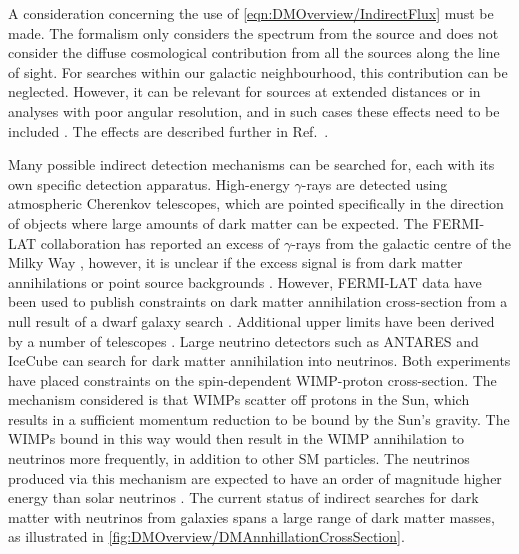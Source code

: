 A consideration concerning the use of \autoref{eqn:DMOverview/IndirectFlux} must be made. The formalism only considers the spectrum from the source and does not consider the diffuse
cosmological contribution from all the sources along the line of sight. For searches within our galactic neighbourhood, this contribution can be neglected. However, it can be relevant for sources at extended distances or in analyses with poor angular resolution, and in such cases these effects need to be included \cite{PerezdelosHeros:2020qyt}. The effects are described further in Ref.~\cite{Beacom:2006tt,Ullio:2002pj}.

Many possible indirect detection mechanisms can be searched for, each with its own specific detection apparatus.
High-energy $\gamma$-rays are detected using atmospheric Cherenkov telescopes, which are pointed specifically in the direction of objects where large amounts of dark matter can be expected. The FERMI-LAT collaboration has reported an excess of $\gamma$-rays from the galactic centre of the Milky Way \cite{Fermi-LAT:2015sau}, however, it is unclear if the excess signal is from dark matter annihilations or point source backgrounds \cite{Boyarsky_2011}. However, FERMI-LAT data have been used to publish constraints on dark matter annihilation cross-section from a null result of a dwarf galaxy search \cite{Fermi-LAT:2015ycq}. Additional upper limits have been derived by a number of telescopes \cite{Aleksic:2013xea,HESS:2014zqa,VERITAS:2017tif}. 
Large neutrino detectors such as ANTARES \cite{ANTARES:2016xuh} and IceCube \cite{IceCube:2009iyf} can search for dark matter annihilation into neutrinos. Both experiments have placed constraints on the spin-dependent WIMP-proton cross-section. The mechanism considered is that WIMPs scatter off protons in the Sun, which results in a sufficient momentum reduction to be bound by the Sun's gravity. The WIMPs bound in this way would then result in the WIMP annihilation to neutrinos more frequently, in addition to other SM particles. The neutrinos produced via this mechanism are expected to have an order of magnitude higher energy than solar neutrinos \cite{Hooper:2025ohk,Super-Kamiokande:2020sgt}. The current status of indirect searches for dark matter with neutrinos from galaxies spans a large range of dark matter masses, as illustrated in \autoref{fig:DMOverview/DMAnnhillationCrossSection}.
